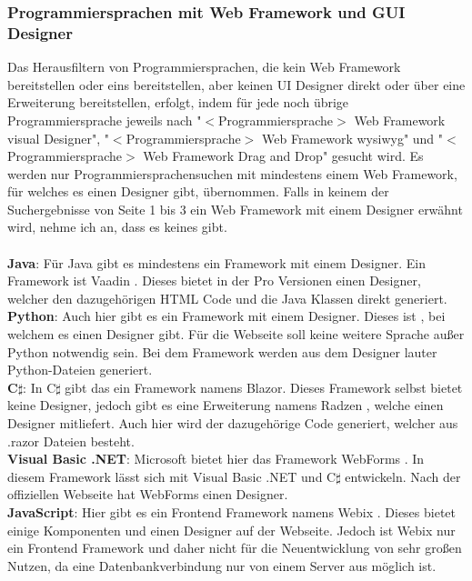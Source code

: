 \documentclass[ngerman]{article}
\begin{document}
    \subsubsection{Programmiersprachen mit Web Framework und GUI Designer}
    \label{GrundlagenProgrammingLanuageWebFramework}
    Das Herausfiltern von Programmiersprachen, die kein Web Framework bereitstellen oder eins bereitstellen, aber keinen UI Designer direkt oder über eine Erweiterung bereitstellen, erfolgt, indem für jede noch übrige Programmiersprache jeweils nach "$<$Programmiersprache$>$ Web Framework visual Designer", "$<$Programmiersprache$>$ Web Framework wysiwyg" und "$<$Programmiersprache$>$ Web Framework Drag and Drop" gesucht wird. Es werden nur Programmiersprachensuchen mit mindestens einem Web Framework, für welches es einen Designer gibt, übernommen. Falls in keinem der Suchergebnisse von Seite 1 bis 3 ein Web Framework mit einem Designer erwähnt wird, nehme ich an, dass es keines gibt.\\\\
    \textbf{Java}: Für Java gibt es mindestens ein Framework mit einem Designer. Ein Framework ist Vaadin \cite{JavaVaadin}. Dieses bietet in der Pro Versionen einen Designer, welcher den dazugehörigen HTML Code und die Java Klassen direkt generiert.\\
    \textbf{Python}: Auch hier gibt es ein Framework mit einem Designer. Dieses ist \cite{PythonAnvil}, bei welchem es einen Designer gibt. Für die Webseite soll keine weitere Sprache außer Python notwendig sein. Bei dem Framework werden aus dem Designer lauter Python-Dateien generiert.\\
    \textbf{C$\sharp$}: In C$\sharp$ gibt das ein Framework namens Blazor. Dieses Framework selbst bietet keine Designer, jedoch gibt es eine Erweiterung namens Radzen \cite{CSharpRadzen}, welche einen Designer mitliefert. Auch hier wird der dazugehörige Code generiert, welcher aus .razor Dateien besteht.\\
    \textbf{Visual Basic .NET}: Microsoft bietet hier das Framework WebForms \cite{WebForms1}. In diesem Framework lässt sich mit Visual Basic .NET und C$\sharp$ entwickeln. Nach der offiziellen Webseite \cite{WebForms2} hat WebForms einen Designer.\\
    \textbf{JavaScript}: Hier gibt es ein Frontend Framework namens Webix \cite{Webix}. Dieses bietet einige Komponenten und einen Designer auf der Webseite. Jedoch ist Webix nur ein Frontend Framework und daher nicht für die Neuentwicklung von sehr großen Nutzen, da eine Datenbankverbindung nur von einem Server aus möglich ist.\\
\end{document}
